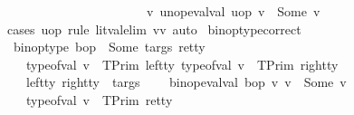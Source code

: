 \begin{isabellebody}
\ \ \ \ \ \ \ \ \ \ \ \ \ \ \ \ \ \ \ \ \ \ \ {\isasymexists}v{\isachardot}{\kern0pt}\ {\isacharparenleft}{\kern0pt}unop{\isacharunderscore}{\kern0pt}eval{\isacharunderscore}{\kern0pt}val\ uop\ v{\isacharprime}{\kern0pt}{\isacharparenright}{\kern0pt}\ {\isacharequal}{\kern0pt}\ Some\ v\ {\isachardoublequoteclose}\isanewline
%
\isadelimproof
\ \ %
\endisadelimproof
%
\isatagproof
{}\isamarkupfalse%
\ {\isacharparenleft}{\kern0pt}cases\ uop{\isacharsemicolon}{\kern0pt}\ rule\ lit{\isacharunderscore}{\kern0pt}val{\isacharunderscore}{\kern0pt}elim{\isacharbrackleft}{\kern0pt}\ v{\isacharequal}{\kern0pt}v{\isacharprime}{\kern0pt}{\isacharbrackright}{\kern0pt}{\isacharsemicolon}{\kern0pt}\ auto{\isacharparenright}{\kern0pt}%
\endisatagproof
{\isafoldproof}%
%
\isadelimproof
\isanewline
%
\endisadelimproof
\isanewline
{}\isamarkupfalse%
\ binop{\isacharunderscore}{\kern0pt}type{\isacharunderscore}{\kern0pt}correct{\isacharcolon}{\kern0pt}\ \isanewline
\ {\isachardoublequoteopen}{\isasymlbrakk}\ binop{\isacharunderscore}{\kern0pt}type\ bop\ {\isacharequal}{\kern0pt}\ Some\ {\isacharparenleft}{\kern0pt}targs{\isacharcomma}{\kern0pt}\ ret{\isacharunderscore}{\kern0pt}ty{\isacharparenright}{\kern0pt}{\isacharsemicolon}{\kern0pt}\ \isanewline
\ \ \ \ type{\isacharunderscore}{\kern0pt}of{\isacharunderscore}{\kern0pt}val\ v{}\ {\isacharequal}{\kern0pt}\ {\isacharparenleft}{\kern0pt}TPrim\ left{\isacharunderscore}{\kern0pt}ty{\isacharparenright}{\kern0pt}{\isacharsemicolon}{\kern0pt}\ type{\isacharunderscore}{\kern0pt}of{\isacharunderscore}{\kern0pt}val\ v{}\ {\isacharequal}{\kern0pt}\ {\isacharparenleft}{\kern0pt}TPrim\ right{\isacharunderscore}{\kern0pt}ty{\isacharparenright}{\kern0pt}{\isacharsemicolon}{\kern0pt}\ \isanewline
\ \ \ \ {\isacharparenleft}{\kern0pt}left{\isacharunderscore}{\kern0pt}ty{\isacharcomma}{\kern0pt}\ right{\isacharunderscore}{\kern0pt}ty{\isacharparenright}{\kern0pt}\ {\isasymin}\ targs{\isacharsemicolon}{\kern0pt}\isanewline
\ \ \ \ {\isacharparenleft}{\kern0pt}binop{\isacharunderscore}{\kern0pt}eval{\isacharunderscore}{\kern0pt}val\ bop\ v{}\ v{}{\isacharparenright}{\kern0pt}\ {\isacharequal}{\kern0pt}\ Some\ v\ \ {\isasymrbrakk}\ {\isasymLongrightarrow}\isanewline
\ \ \ \ type{\isacharunderscore}{\kern0pt}of{\isacharunderscore}{\kern0pt}val\ v\ {\isacharequal}{\kern0pt}\ TPrim\ ret{\isacharunderscore}{\kern0pt}ty{\isachardoublequoteclose}\isanewline
%
\isadelimproof
\ \ %
\endisadelimproof
%
\isatagproof
{}\isamarkupfalse%

\end{isabellebody}
